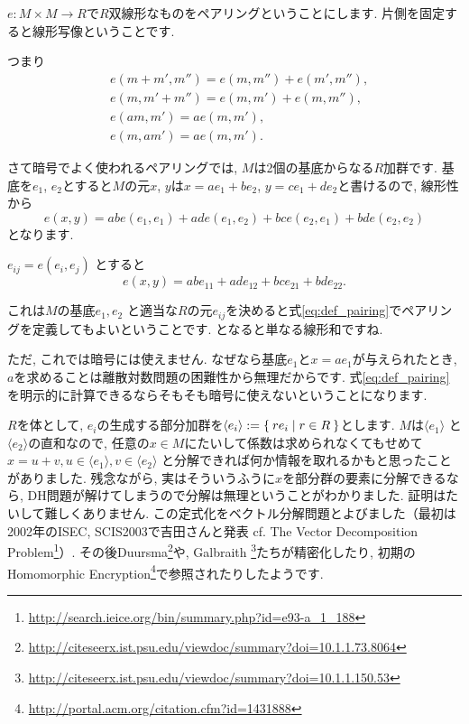 \documentclass{jsarticle}
\theoremstyle{definition}
\numberwithin{theorem}{section}
\begin{document}
$e: M\times M \rightarrow R$で$R$双線形なものをペアリングということにします.
片側を固定すると線形写像ということです.

つまり
\begin{align*}
& e(m+m', m'') = e(m, m'') + e(m', m''),\\
& e(m, m'+m'') = e(m, m') + e(m, m''),\\
& e(am, m') = ae(m, m'),\\
& e(m, am') = ae(m, m').
\end{align*}

さて暗号でよく使われるペアリングでは, $M$は2個の基底からなる$R$加群です. 基底を$e_1$, $e_2$とすると$M$の元$x$, $y$は$x = ae_1+be_2$,
$y = ce_1 + de_2$と書けるので, 線形性から
\[
e(x, y) = ab e(e_1, e_1) + ad e(e_1, e_2) + bc e(e_2, e_1) + bd e(e_2, e_2)
\]
となります.

$e_{ij} = e(e_i, e_j)$ とすると
\begin{equation}
\label{eq:def_pairing}
e(x, y) = ab e_{11} + ad e_{12} + bc e_{21} + bd e_{22}.
\end{equation}

これは$M$の基底$e_1, e_2$ と適当な$R$の元$e_{ij}$を決めると式\ref{eq:def_pairing}でペアリングを定義してもよいということです.
となると単なる線形和ですね.

ただ, これでは暗号には使えません. なぜなら基底$e_1$と$x = ae_1$が与えられたとき, $a$を求めることは離散対数問題の困難性から無理だからです.
式\ref{eq:def_pairing}を明示的に計算できるならそもそも暗号に使えないということになります.

$R$を体として, $e_i$の生成する部分加群を$\langle e_i \rangle := \Set{re_i | r \in R}$とします. $M$は$\langle e_1\rangle$
と$\langle e_2\rangle$の直和なので, 任意の$x\in M$にたいして係数は求められなくてもせめて$x = u+v, u \in \langle e_1\rangle, v \in \langle e_2\rangle$
と分解できれば何か情報を取れるかもと思ったことがありました. 残念ながら, 実はそういうふうに$x$を部分群の要素に分解できるなら, DH問題が解けてしまうので分解は無理ということがわかりました.
証明はたいして難しくありません. この定式化をベクトル分解問題とよびました（最初は2002年のISEC, SCIS2003で吉田さんと発表 cf.
The Vector Decomposition Problem\footnote{\url{http://search.ieice.org/bin/summary.php?id=e93-a_1_188}}）.
その後Duursma\footnote{\url{http://citeseerx.ist.psu.edu/viewdoc/summary?doi=10.1.1.73.8064}}や, Galbraith
\footnote{\url{http://citeseerx.ist.psu.edu/viewdoc/summary?doi=10.1.1.150.53}}たちが精密化したり,
初期のHomomorphic Encryption\footnote{\url{http://portal.acm.org/citation.cfm?id=1431888}}で参照されたりしたようです.
\end{document}
